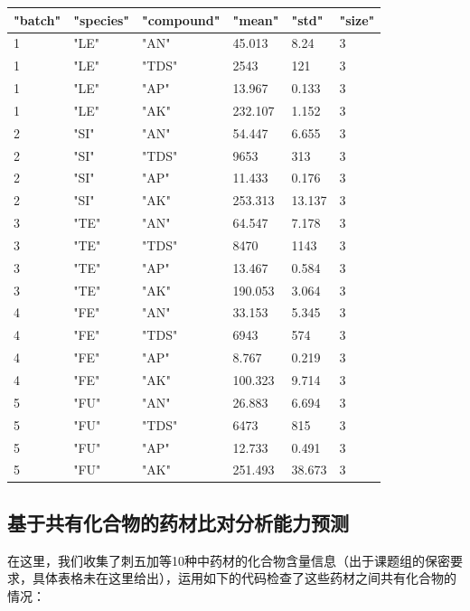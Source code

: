 \begin{table}[H]
  \centering
  \begin{tabular}{|l|l|l|l|l|l|}
  \hline
      "batch" & "species" & "compound" & "mean" & "std" & "size" \\ \hline
      1 & "LE" & "AN" & 45.013 & 8.24 & 3 \\ \hline
      1 & "LE" & "TDS" & 2543 & 121 & 3 \\ \hline
      1 & "LE" & "AP" & 13.967 & 0.133 & 3 \\ \hline
      1 & "LE" & "AK" & 232.107 & 1.152 & 3 \\ \hline
      2 & "SI" & "AN" & 54.447 & 6.655 & 3 \\ \hline
      2 & "SI" & "TDS" & 9653 & 313 & 3 \\ \hline
      2 & "SI" & "AP" & 11.433 & 0.176 & 3 \\ \hline
      2 & "SI" & "AK" & 253.313 & 13.137 & 3 \\ \hline
      3 & "TE" & "AN" & 64.547 & 7.178 & 3 \\ \hline
      3 & "TE" & "TDS" & 8470 & 1143 & 3 \\ \hline
      3 & "TE" & "AP" & 13.467 & 0.584 & 3 \\ \hline
      3 & "TE" & "AK" & 190.053 & 3.064 & 3 \\ \hline
      4 & "FE" & "AN" & 33.153 & 5.345 & 3 \\ \hline
      4 & "FE" & "TDS" & 6943 & 574 & 3 \\ \hline
      4 & "FE" & "AP" & 8.767 & 0.219 & 3 \\ \hline
      4 & "FE" & "AK" & 100.323 & 9.714 & 3 \\ \hline
      5 & "FU" & "AN" & 26.883 & 6.694 & 3 \\ \hline
      5 & "FU" & "TDS" & 6473 & 815 & 3 \\ \hline
      5 & "FU" & "AP" & 12.733 & 0.491 & 3 \\ \hline
      5 & "FU" & "AK" & 251.493 & 38.673 & 3 \\ \hline
  \end{tabular}
\end{table}

\subsection{基于共有化合物的药材比对分析能力预测}

在这里，我们收集了刺五加等10种中药材的化合物含量信息（出于课题组的保密要求，具体表格未在这里给出），运用如下的代码检查了这些药材之间共有化合物的情况：

